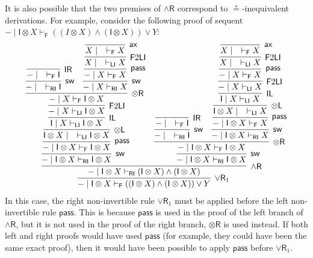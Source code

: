 \documentclass[submission,copyright,creativecommons]{eptcs}
\theoremstyle{definition}
\newcommand{\tl}{\otimes \mathsf{L}}
\newcommand{\tr}{\otimes \mathsf{R}}
\newcommand{\pass}{\mathsf{pass}}
\newcommand{\unitl}{\mathsf{IL}}
\newcommand{\unitr}{\mathsf{IR}}
\newcommand{\andr}{\land \mathsf{R}}
\newcommand{\orrone}{\lor \mathsf{R}_{1}}
\newcommand{\ax}{\mathsf{ax}}
\newcommand{\ot}{\otimes}
\newcommand{\I}{\mathsf{I}}
\newcommand{\RI}{\mathsf{RI}}
\newcommand{\LI}{\mathsf{LI}}
\newcommand{\F}{\mathsf{F}}
\newcommand{\sw}{\mathsf{sw}}
\begin{document}
It is also possible that the two premises of $\andr$ correspond to $\circeq$-inequivalent derivations.
For example, consider the following proof of sequent $- \mid \I \ot X \vdash_\F ((I \ot X) \land (\I \ot X)) \lor Y$:
\begin{equation*}
  \begin{array}{c}
    \infer[\orrone]{- \mid \I \ot X \vdash_\F ((\I \ot X) \land (\I \ot X)) \lor Y}{
      \infer[\andr]{- \mid \I \ot X \vdash_\RI (\I \ot X) \land (\I \ot X)}{
        \infer[\sw]{- \mid \I \ot X \vdash_\RI \I \ot X}{
        \infer[\pass]{- \mid \I \ot X \vdash_\F \I \ot X}{
          \infer[\tl]{\I \ot X \mid \quad \vdash_\LI \I \ot X}{
          \infer[\unitl]{\I \mid X \vdash_\LI \I \ot X}{
            \infer[\F 2 \LI]{- \mid X \vdash_\LI \I \ot X}{
            \infer[\tr]{- \mid X \vdash_\F \I \ot X}{
                \infer[\sw]{- \mid \quad \vdash_\RI \I}{
                \infer[\unitr]{- \mid \quad \vdash_\F \I}{}
              }
              &
              \infer[\sw]{- \mid X \vdash_\RI X}{
              \infer[\pass]{- \mid X \vdash_\F X}{
                \infer[\F 2 \LI]{X \mid \quad \vdash_\LI X}{
                \infer[\ax]{X \mid \quad \vdash_\F X}{}
              }
            }
          }
        }
        }}}}}
        &
        \infer[\sw]{- \mid \I \ot X \vdash_\RI \I \ot X}{
        \infer[\tr]{- \mid \I \ot X \vdash_\F \I \ot X}{
          \infer[\sw]{- \mid \quad \vdash_\RI \I}{
            \infer[\unitr]{- \mid \quad \vdash_\F \I}{}
            }
          &
          \infer[\sw]{- \mid \I \ot X \vdash_\RI X}{
          \infer[\pass]{- \mid \I \ot X \vdash_\F X}{
            \infer[\tl]{\I \ot X \mid \quad \vdash_\LI X}{
              \infer[\unitl]{\I \mid X \vdash_\LI X}{
                \infer[\F 2 \LI]{- \mid X \vdash_\LI X}{
                \infer[\pass]{- \mid X \vdash_\F X}{
                  \infer[\F 2 \LI]{X \mid \quad \vdash_\LI X}{
                  \infer[\ax]{X \mid \quad \vdash_\F X}{}
                }
              }
            }
          }
        }
      }
    }}}}}
  \end{array}
\end{equation*}
In this case,
the right non-invertible rule $\orrone$ must be applied before the left non-invertible rule $\pass$. This is because $\pass$ is used in the proof of the left branch of $\andr$, but it is not used in the proof of the right branch, $\tr$ is used instead. If both left and right proofs would have used $\pass$ (for example, they could have been the same exact proof), then it would have been possible to apply $\pass$ before $\orrone$.
\end{document}
